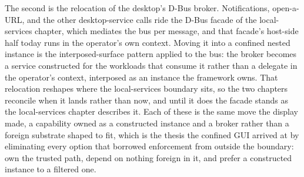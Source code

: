 The second is the relocation of the desktop's D-Bus broker.
Notifications, open-a-URL, and the other desktop-service calls ride the
D-Bus facade of the local-services chapter, which mediates the bus per
message, and that facade's host-side half today runs in the operator's
own context. Moving it into a confined nested instance is the
interposed-surface pattern applied to the bus: the broker becomes a
service constructed for the workloads that consume it rather than a
delegate in the operator's context, interposed as an instance the
framework owns. That relocation reshapes where the local-services
boundary sits, so the two chapters reconcile when it lands rather than
now, and until it does the facade stands as the local-services chapter
describes it. Each of these is the same move the display made, a
capability owned as a constructed instance and a broker rather than a
foreign substrate shaped to fit, which is the thesis the confined GUI
arrived at by eliminating every option that borrowed enforcement from
outside the boundary: own the trusted path, depend on nothing foreign in
it, and prefer a constructed instance to a filtered one.
